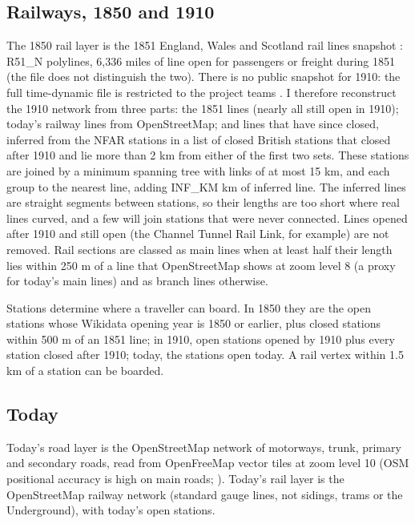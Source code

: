 \subsection{Railways, 1850 and 1910}
The 1850 rail layer is the 1851 England, Wales and Scotland rail lines snapshot \citep{satchell2023}: {{R51_N}} polylines, 6,336 miles of line open for passengers or freight during 1851 (the file does not distinguish the two). There is no public snapshot for 1910: the full time-dynamic file is restricted to the project teams \citep{marti2017}. I therefore reconstruct the 1910 network from three parts: the 1851 lines (nearly all still open in 1910); today's railway lines from OpenStreetMap; and lines that have since closed, inferred from the {{NFAR}} stations in a list of closed British stations that closed after 1910 and lie more than 2 km from either of the first two sets. These stations are joined by a minimum spanning tree with links of at most 15 km, and each group to the nearest line, adding {{INF_KM}} km of inferred line. The inferred lines are straight segments between stations, so their lengths are too short where real lines curved, and a few will join stations that were never connected. Lines opened after 1910 and still open (the Channel Tunnel Rail Link, for example) are not removed. Rail sections are classed as main lines when at least half their length lies within 250 m of a line that OpenStreetMap shows at zoom level 8 (a proxy for today's main lines) and as branch lines otherwise.

Stations determine where a traveller can board. In 1850 they are the open stations whose Wikidata opening year is 1850 or earlier, plus closed stations within 500 m of an 1851 line; in 1910, open stations opened by 1910 plus every station closed after 1910; today, the stations open today. A rail vertex within 1.5 km of a station can be boarded.

\subsection{Today}
Today's road layer is the OpenStreetMap network of motorways, trunk, primary and secondary roads, read from OpenFreeMap vector tiles at zoom level 10 (OSM positional accuracy is high on main roads; \citealp{haklay2010}). Today's rail layer is the OpenStreetMap railway network (standard gauge lines, not sidings, trams or the Underground), with today's open stations.

